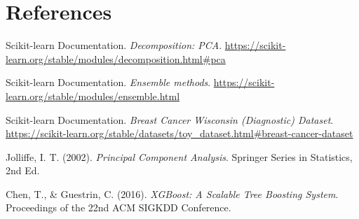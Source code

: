 \documentclass[12pt,a4paper]{article}
\begin{document}
\section{References}
\begin{enumerate}[label={[\arabic*]}]
    \item Scikit-learn Documentation. \textit{Decomposition: PCA}. \url{https://scikit-learn.org/stable/modules/decomposition.html#pca}
    \item Scikit-learn Documentation. \textit{Ensemble methods}. \url{https://scikit-learn.org/stable/modules/ensemble.html}
    \item Scikit-learn Documentation. \textit{Breast Cancer Wisconsin (Diagnostic) Dataset}. \url{https://scikit-learn.org/stable/datasets/toy_dataset.html#breast-cancer-dataset}
    \item Jolliffe, I. T. (2002). \textit{Principal Component Analysis}. Springer Series in Statistics, 2nd Ed.
    \item Chen, T., \& Guestrin, C. (2016). \textit{XGBoost: A Scalable Tree Boosting System}. Proceedings of the 22nd ACM SIGKDD Conference.
\end{enumerate}
\end{document}
